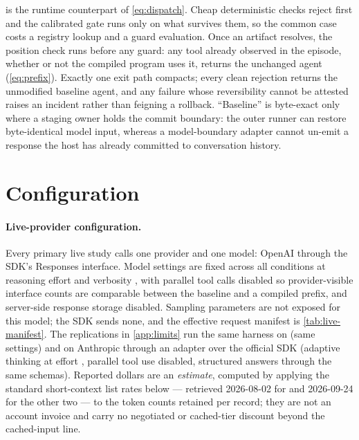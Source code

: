  is the runtime counterpart of \cref{eq:dispatch}. Cheap
deterministic checks reject first and the calibrated gate runs only on what
survives them, so the common case costs a registry lookup and a guard
evaluation. Once an artifact resolves, the position check runs before any
guard: any tool already observed in the episode, whether or not the compiled
program uses it, returns the unchanged agent (\cref{eq:prefix}). Exactly one exit path compacts; every clean rejection returns the
unmodified baseline agent, and any failure whose reversibility cannot be
attested raises an incident rather than feigning a rollback. ``Baseline'' is
byte-exact only where a staging owner holds the commit boundary: the outer
runner can restore byte-identical model input, whereas a model-boundary adapter
cannot un-emit a response the host has already committed to conversation
history.

\section{Configuration}
\label{app:config}

\paragraph{Live-provider configuration.}
Every primary live study calls one provider and one model: OpenAI
 through the  SDK's Responses interface.
Model settings are fixed across all conditions at reasoning effort 
and verbosity , with parallel tool calls disabled so provider-visible
interface counts are comparable between the baseline and a compiled prefix, and
server-side response storage disabled. Sampling parameters are not exposed for
this model; the SDK sends none, and the effective request manifest is
\cref{tab:live-manifest}. The replications in \cref{app:limits} run the same
harness on  (same settings) and on Anthropic
 through an adapter over the official SDK (adaptive
thinking at effort , parallel tool use disabled, structured answers
through the same schemas). Reported dollars are an \emph{estimate}, computed by
applying the standard short-context list rates below
\citep{openai2026pricing,anthropic2026pricing} --- retrieved
2026-08-02 for  and 2026-09-24 for the other two --- to the
token counts retained per record; they are not an account invoice and carry no
negotiated or cached-tier discount beyond the cached-input line.

